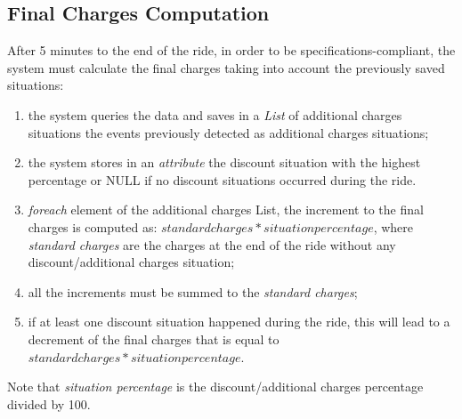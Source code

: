 \subsection{Final Charges Computation}
After 5 minutes to the end of the ride, in order to be specifications-compliant, the system must calculate the final charges taking into account the previously saved situations:
\begin{enumerate}
\item the system queries the data and saves in a \emph{List} of additional charges situations the events previously detected as additional charges situations;
\item the system stores in an \emph{attribute} the discount situation with the highest percentage or NULL if no discount situations occurred during the ride.
\item \emph{foreach} element of the additional charges List, the increment to the final charges is computed as: $standard charges * situation percentage$, where \emph{standard charges} are the charges at the end of the ride without any discount/additional charges situation;
\item all the increments must be summed to the \emph{standard charges};
\item if at least one discount situation happened during the ride, this will lead to a decrement of the final charges that is equal to $standard charges * situation percentage$.
\end{enumerate}
\noindent
Note that \emph{situation percentage} is the discount/additional charges percentage divided by 100. 